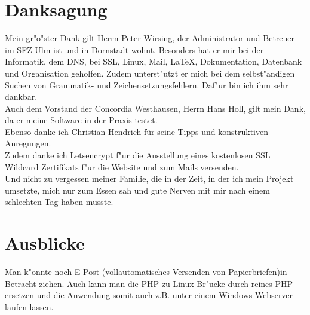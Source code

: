 \documentclass[12pt,twoside]{article}  %
\begin{document}
  \section{Danksagung}
    Mein gr"o"ster Dank gilt Herrn Peter Wirsing, der Administrator und Betreuer im 
    SFZ Ulm ist und in Dornstadt wohnt. Besonders hat er mir bei der Informatik, 
    dem DNS, bei SSL, Linux, Mail, LaTeX, Dokumentation, Datenbank 
    und Organisation geholfen. Zudem unterst"utzt er mich bei dem selbst"andigen Suchen von Grammatik- und Zeichensetzungsfehlern. Daf"ur bin ich ihm sehr dankbar. \\
    Auch dem Vorstand der Concordia Westhausen, Herrn Hans Holl, gilt mein Dank, da er meine Software in der Praxis testet. \\
    Ebenso danke ich Christian Hendrich für seine Tipps und konstruktiven Anregungen. \\
    Zudem danke ich Letsencrypt f"ur die Ausstellung eines kostenlosen SSL Wildcard Zertifikats f"ur die Website und zum Mails versenden. \\
    Und nicht zu vergessen meiner Familie, die in der Zeit, in der ich mein Projekt umsetzte, mich nur zum Essen sah und gute Nerven mit mir nach einem schlechten Tag haben musste.

  \section{Ausblicke}
    Man k"onnte noch E-Post (vollautomatisches Versenden von Papierbriefen)in Betracht ziehen.
    Auch kann man die PHP zu Linux Br"ucke durch reines PHP ersetzen und die Anwendung somit auch z.B. unter einem Windows Webserver laufen lassen. 
\end{document}
